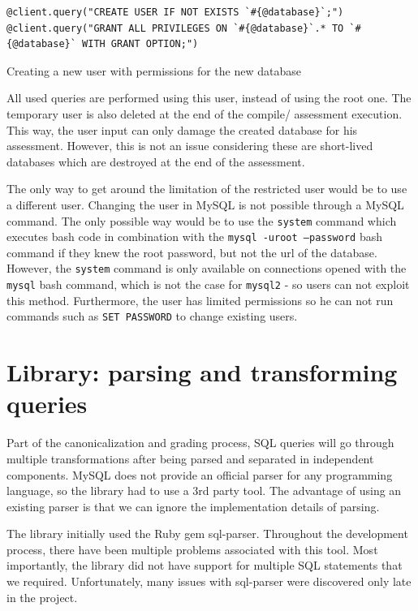 \begin{code}
\begin{verbatim}
@client.query("CREATE USER IF NOT EXISTS `#{@database}`;")
@client.query("GRANT ALL PRIVILEGES ON `#{@database}`.* TO `#{@database}` WITH GRANT OPTION;")
\end{verbatim}
\caption{Creating a new user with permissions for the new database}
\label{fig:creating_new_user}
\end{code}

All used queries are performed using this user, instead of using the root one. The temporary user is also deleted at the end of the compile/ assessment execution. This way, the user input can only damage the created database for his assessment. However, this is not an issue considering these are short-lived databases which are destroyed at the end of the assessment.

The only way to get around the limitation of the restricted user would be to use a different user. Changing the user in MySQL is not possible through a MySQL command. The only possible way would be to use the \texttt{system} command which executes bash code in combination with the \texttt{mysql -uroot --password} bash command if they knew the root password, but not the url of the database. However, the \texttt{system} command is only available on connections opened with the \texttt{mysql} bash command, which is not the case for \texttt{mysql2} - so users can not exploit this method. Furthermore, the user has limited permissions so he can not run commands such as \texttt{SET PASSWORD} to change existing users.

\section{Library: parsing and transforming queries}

Part of the canonicalization and grading process, SQL queries will go through multiple transformations after being parsed and separated in independent components. MySQL does not provide an official parser for any programming language, so the library had to use a 3rd party tool. The advantage of using an existing parser is that we can ignore the implementation details of parsing.

The library initially used the Ruby gem sql-parser. Throughout the development process, there have been multiple problems associated with this tool. Most importantly, the library did not have support for multiple SQL statements that we required. Unfortunately, many issues with sql-parser were discovered only late in the project.

